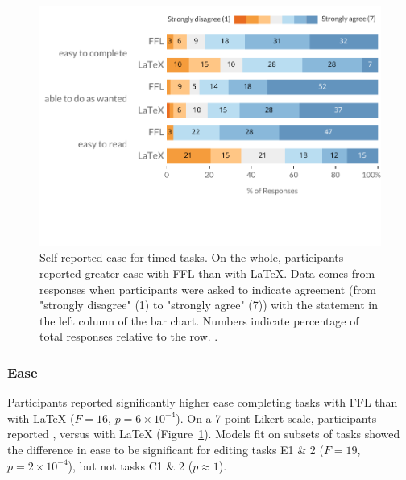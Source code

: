 \begin{figure}
    \centering
    \includegraphics[width=\linewidth]{figures/Responses.pdf}
    \vspace{-2.5em}
    \caption{Self-reported ease for timed tasks. On the whole, participants reported greater ease with FFL than with LaTeX. \normalfont Data comes from responses when participants were asked to indicate agreement (from "strongly disagree" (1) to "strongly agree" (7)) with the statement in the left column of the bar chart. Numbers indicate percentage of total responses relative to the row. .}
    \label{fig:responses}
\end{figure}

\subsubsection{Ease}\label{sec:ease}

Participants reported significantly higher ease completing tasks with FFL than with LaTeX ($F=16$, $p=6\times10^{-4}$). On a 7-point Likert scale, participants reported , versus  with LaTeX (Figure~\ref{fig:responses}). Models fit on subsets of tasks showed the difference in ease to be significant for editing tasks E1 \& 2 ($F=19$, $p=2\times10^{-4}$), but not tasks C1 \& 2 ($p\approx1$).


